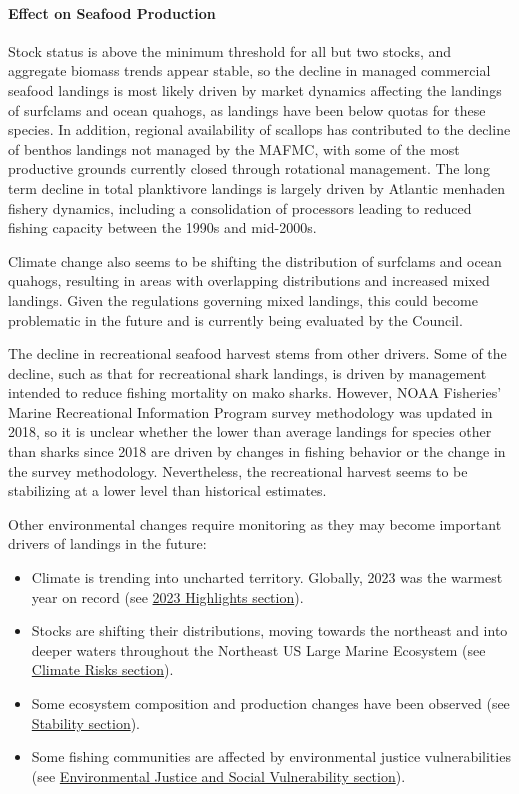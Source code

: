 \documentclass[
  10pt,
]{article}
\providecommand{\tightlist}{%
  \setlength{\itemsep}{0pt}\setlength{\parskip}{0pt}}
\begin{document}
\hypertarget{effect-on-seafood-production}{%
\paragraph{Effect on Seafood Production}\label{effect-on-seafood-production}}

Stock status is above the minimum threshold for all but two stocks, and aggregate biomass trends appear stable, so the decline in managed commercial seafood landings is most likely driven by market dynamics affecting the landings of surfclams and ocean quahogs, as landings have been below quotas for these species. In addition, regional availability of scallops has contributed to the decline of benthos landings not managed by the MAFMC, with some of the most productive grounds currently closed through rotational management. The long term decline in total planktivore landings is largely driven by Atlantic menhaden fishery dynamics, including a consolidation of processors leading to reduced fishing capacity between the 1990s and mid-2000s.

Climate change also seems to be shifting the distribution of surfclams and ocean quahogs, resulting in areas with overlapping distributions and increased mixed landings. Given the regulations governing mixed landings, this could become problematic in the future and is currently being evaluated by the Council.

The decline in recreational seafood harvest stems from other drivers. Some of the decline, such as that for recreational shark landings, is driven by management intended to reduce fishing mortality on mako sharks. However, NOAA Fisheries' Marine Recreational Information Program survey methodology was updated in 2018, so it is unclear whether the lower than average landings for species other than sharks since 2018 are driven by changes in fishing behavior or the change in the survey methodology. Nevertheless, the recreational harvest seems to be stabilizing at a lower level than historical estimates.

Other environmental changes require monitoring as they may become important drivers of landings in the future:

\begin{itemize}
\tightlist
\item
  Climate is trending into uncharted territory. Globally, 2023 was the warmest year on record (see \protect\hyperlink{highlights}{2023 Highlights section}).
\item
  Stocks are shifting their distributions, moving towards the northeast and into deeper waters throughout the Northeast US Large Marine Ecosystem (see \protect\hyperlink{climate-and-ecosystem-change}{Climate Risks section}).
\item
  Some ecosystem composition and production changes have been observed (see \protect\hyperlink{stability}{Stability section}).
\item
  Some fishing communities are affected by environmental justice vulnerabilities (see \protect\hyperlink{environmental-justice-and-social-vulnerability}{Environmental Justice and Social Vulnerability section}).
\end{itemize}
\end{document}

